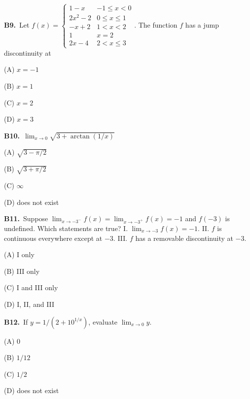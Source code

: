 \documentclass[11pt]{article}
\begin{document}
\bigskip\noindent\textbf{B9.}\ Let $f(x)=\begin{cases}1-x&-1\le x<0\\2x^2-2&0\le x\le1\\-x+2&1<x<2\\1&x=2\\2x-4&2<x\le3\end{cases}$. The function $f$ has a jump discontinuity at
\begin{list}{}{\setlength{\leftmargin}{3em}\setlength{\labelwidth}{2.5em}\setlength{\itemsep}{0pt}\setlength{\topsep}{2pt}}
\item[(A)] $x = -1$
\item[(B)] $x = 1$
\item[(C)] $x = 2$
\item[(D)] $x = 3$
\end{list}

\bigskip\noindent\textbf{B10.}\ $\displaystyle\lim_{x\to0}\sqrt{3+\arctan(1/x)}$
\begin{list}{}{\setlength{\leftmargin}{3em}\setlength{\labelwidth}{2.5em}\setlength{\itemsep}{0pt}\setlength{\topsep}{2pt}}
\item[(A)] $\sqrt{3-\pi/2}$
\item[(B)] $\sqrt{3+\pi/2}$
\item[(C)] $\infty$
\item[(D)] does not exist
\end{list}

\bigskip\noindent\textbf{B11.}\ Suppose $\lim_{x\to-3^-}f(x)=\lim_{x\to-3^+}f(x)=-1$ and $f(-3)$ is undefined. Which statements are true? I. $\lim_{x\to-3}f(x)=-1$. II. $f$ is continuous everywhere except at $-3$. III. $f$ has a removable discontinuity at $-3$.
\begin{list}{}{\setlength{\leftmargin}{3em}\setlength{\labelwidth}{2.5em}\setlength{\itemsep}{0pt}\setlength{\topsep}{2pt}}
\item[(A)] I only
\item[(B)] III only
\item[(C)] I and III only
\item[(D)] I, II, and III
\end{list}

\bigskip\noindent\textbf{B12.}\ If $y=1/(2+10^{1/x})$, evaluate $\lim_{x\to0}y$.
\begin{list}{}{\setlength{\leftmargin}{3em}\setlength{\labelwidth}{2.5em}\setlength{\itemsep}{0pt}\setlength{\topsep}{2pt}}
\item[(A)] $0$
\item[(B)] $1/12$
\item[(C)] $1/2$
\item[(D)] does not exist
\end{list}
\end{document}
